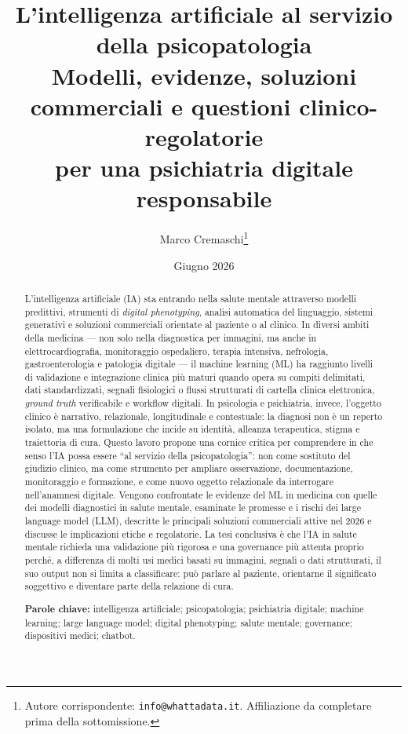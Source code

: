 \documentclass[11pt,a4paper]{article}
\title{\textbf{L'intelligenza artificiale al servizio della psicopatologia}\\[0.4em]
\large Modelli, evidenze, soluzioni commerciali e questioni clinico-regolatorie\\
per una psichiatria digitale responsabile}
\author{Marco Cremaschi\thanks{Autore corrispondente: \texttt{info@whattadata.it}. Affiliazione da completare prima della sottomissione.}}
\date{Giugno 2026}
\begin{document}
\maketitle

\begin{abstract}
\noindent L'intelligenza artificiale (IA) sta entrando nella salute mentale attraverso modelli predittivi, strumenti di \emph{digital phenotyping}, analisi automatica del linguaggio, sistemi generativi e soluzioni commerciali orientate al paziente o al clinico. In diversi ambiti della medicina --- non solo nella diagnostica per immagini, ma anche in elettrocardiografia, monitoraggio ospedaliero, terapia intensiva, nefrologia, gastroenterologia e patologia digitale --- il machine learning (ML) ha raggiunto livelli di validazione e integrazione clinica più maturi quando opera su compiti delimitati, dati standardizzati, segnali fisiologici o flussi strutturati di cartella clinica elettronica, \emph{ground truth} verificabile e workflow digitali. In psicologia e psichiatria, invece, l'oggetto clinico è narrativo, relazionale, longitudinale e contestuale: la diagnosi non è un reperto isolato, ma una formulazione che incide su identità, alleanza terapeutica, stigma e traiettoria di cura. Questo lavoro propone una cornice critica per comprendere in che senso l'IA possa essere ``al servizio della psicopatologia'': non come sostituto del giudizio clinico, ma come strumento per ampliare osservazione, documentazione, monitoraggio e formazione, e come nuovo oggetto relazionale da interrogare nell'anamnesi digitale. Vengono confrontate le evidenze del ML in medicina con quelle dei modelli diagnostici in salute mentale, esaminate le promesse e i rischi dei large language model (LLM), descritte le principali soluzioni commerciali attive nel 2026 e discusse le implicazioni etiche e regolatorie. La tesi conclusiva è che l'IA in salute mentale richieda una validazione più rigorosa e una governance più attenta proprio perché, a differenza di molti usi medici basati su immagini, segnali o dati strutturati, il suo output non si limita a classificare: può parlare al paziente, orientarne il significato soggettivo e diventare parte della relazione di cura.

\vspace{0.8em}
\noindent\textbf{Parole chiave:} intelligenza artificiale; psicopatologia; psichiatria digitale; machine learning; large language model; digital phenotyping; salute mentale; governance; dispositivi medici; chatbot.
\end{abstract}
\end{document}

